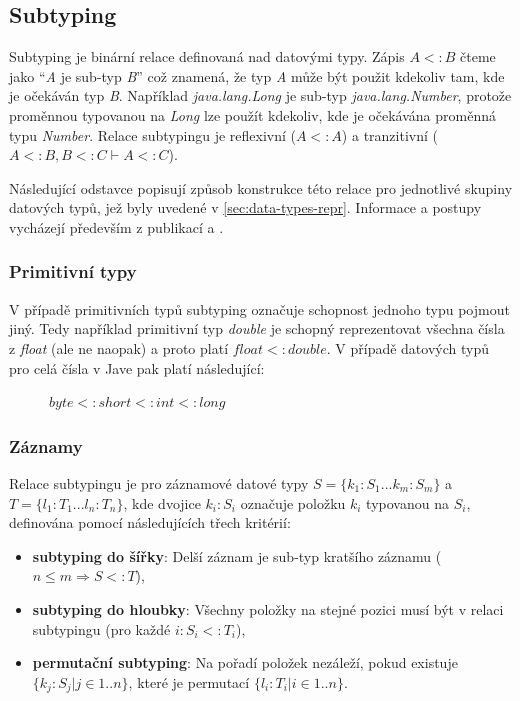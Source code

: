 \documentclass[czech,DP]{thesiskiv}
\begin{document}
\subsection{Subtyping}
\label{sec:subtyping}

Subtyping je binární relace definovaná nad datovými typy. Zápis $A <: B$ čteme jako ``\textit{A} je sub-typ \textit{B}'' což znamená, že typ \textit{A} může být použit kdekoliv tam, kde je očekáván typ \textit{B}. Například \textit{java.lang.Long} je sub-typ \textit{java.lang.Number}, protože proměnnou typovanou na \textit{Long} lze použít kdekoliv, kde je očekávána proměnná typu \textit{Number}. Relace subtypingu je reflexivní ($A <: A$) a tranzitivní ($A <: B, B <: C \vdash A <: C$).


Následující odstavce popisují způsob konstrukce této relace pro jednotlivé skupiny datových typů, jež byly uvedené v \ref{sec:data-types-repr}. Informace a postupy vycházejí především z publikací \cite{pierce2002} a  \cite{abadi1995subytping}.

\subsubsection{Primitivní typy}

V případě primitivních typů subtyping označuje schopnost jednoho typu pojmout jiný. Tedy například primitivní typ \textit{double} je schopný reprezentovat všechna čísla z \textit{float} (ale ne naopak) a proto platí $float <: double$. V případě datových typů pro celá čísla v Jave pak platí následující:

\begin{figure}[h]
	\centering
	$byte <: short <: int <: long$
\end{figure}

\subsubsection{Záznamy}

Relace subtypingu je pro záznamové datové typy $S = \{k_1:S_1 ... k_m:S_m\}$ a $T = \{l_1:T_1 ... l_n:T_n\}$, kde dvojice $k_i:S_i$ označuje položku $k_i$ typovanou na $S_i$, definována pomocí následujících třech kritérií:

\begin{itemize}
	\item \textbf{subtyping do šířky}: Delší záznam je sub-typ kratšího záznamu ($n \le m \Rightarrow S <: T $),
	\item \textbf{subtyping do hloubky}: Všechny položky na stejné pozici musí být v relaci subtypingu (pro každé $i : S_i <: T_i$),
	\item \textbf{permutační subtyping}: Na pořadí položek nezáleží, pokud existuje $\{k_j:S_j | j \in 1..n \}$, které je permutací $\{l_i:T_i | i \in 1..n \}$.
\end{itemize}
\end{document}
